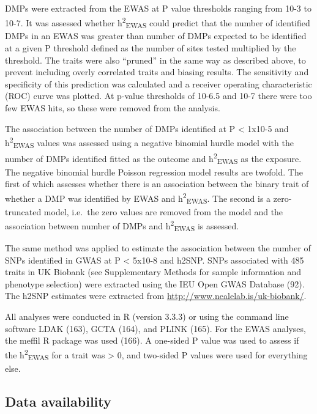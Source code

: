 \documentclass[11pt,oneside]{bristolthesis}
\begin{document}
DMPs were extracted from the EWAS at P value thresholds ranging from 10-3 to 10-7. It was assessed whether h\textsuperscript{2}\textsubscript{EWAS} could predict that the number of identified DMPs in an EWAS was greater than number of DMPs expected to be identified at a given P threshold defined as the number of sites tested multiplied by the threshold. The traits were also ``pruned'' in the same way as described above, to prevent including overly correlated traits and biasing results. The sensitivity and specificity of this prediction was calculated and a receiver operating characteristic (ROC) curve was plotted. At p-value thresholds of 10-6.5 and 10-7 there were too few EWAS hits, so these were removed from the analysis.

The association between the number of DMPs identified at P \textless{} 1x10-5 and h\textsuperscript{2}\textsubscript{EWAS} values was assessed using a negative binomial hurdle model with the number of DMPs identified fitted as the outcome and h\textsuperscript{2}\textsubscript{EWAS} as the exposure. The negative binomial hurdle Poisson regression model results are twofold. The first of which assesses whether there is an association between the binary trait of whether a DMP was identified by EWAS and h\textsuperscript{2}\textsubscript{EWAS}. The second is a zero-truncated model, i.e.~the zero values are removed from the model and the association between number of DMPs and h\textsuperscript{2}\textsubscript{EWAS} is assessed.

The same method was applied to estimate the association between the number of SNPs identified in GWAS at P \textless{} 5x10-8 and h2SNP. SNPs associated with 485 traits in UK Biobank (see Supplementary Methods for sample information and phenotype selection) were extracted using the IEU Open GWAS Database (92). The h2SNP estimates were extracted from \url{http://www.nealelab.is/uk-biobank/}.

All analyses were conducted in R (version 3.3.3) or using the command line software LDAK (163), GCTA (164), and PLINK (165). For the EWAS analyses, the meffil R package was used (166). A one-sided P value was used to assess if the h\textsuperscript{2}\textsubscript{EWAS} for a trait was \textgreater{} 0, and two-sided P values were used for everything else.

\hypertarget{data-availability-05}{%
\subsection{Data availability}\label{data-availability-05}}
\end{document}
